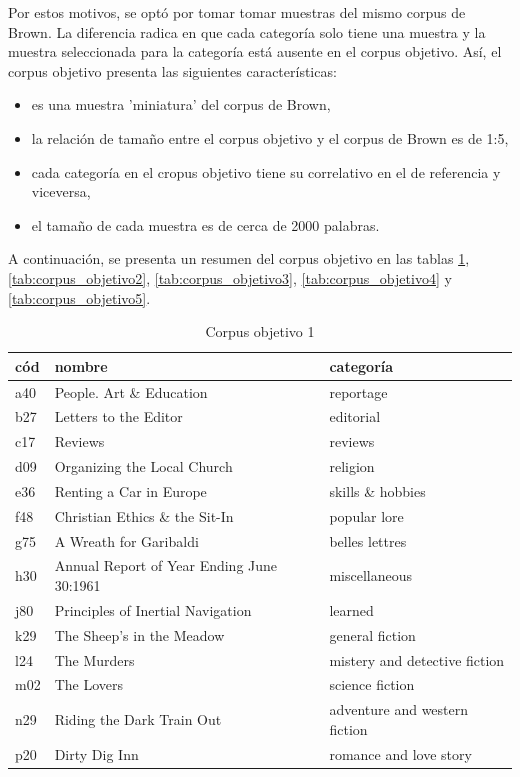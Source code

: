 \documentclass[12pt,letterpaper,twoside]{article}
\begin{document}
Por estos motivos, se optó por tomar tomar muestras del mismo corpus de Brown.
La diferencia radica en que cada categoría solo tiene una muestra y la muestra
seleccionada para la categoría está ausente en el corpus objetivo. Así,
el corpus objetivo presenta las siguientes características:

\begin{itemize}
\item es una muestra 'miniatura' del corpus de Brown,
\item la relación de tamaño entre el corpus objetivo y el corpus de Brown es de 1:5,
\item cada categoría en el cropus objetivo tiene su correlativo en el de referencia y viceversa,
\item el tamaño de cada muestra es de cerca de 2000 palabras.
\end{itemize}

A continuación, se presenta un resumen del corpus objetivo en las
tablas \ref{tab:corpus_objetivo1},
\ref{tab:corpus_objetivo2}, \ref{tab:corpus_objetivo3},
\ref{tab:corpus_objetivo4} y \ref{tab:corpus_objetivo5}.



   \begin{table}[!ht]
    \centering

    \begin{tabular}{|l|l|l|}
    \hline
	cód & nombre & categoría \\ \hline
      a40 & People. Art \& Education & reportage \\ \hline
      b27 & Letters to the Editor & editorial \\ \hline
      c17 & Reviews & reviews \\ \hline
      d09 & Organizing the Local Church & religion \\ \hline
      e36 & Renting a Car in Europe & skills \& hobbies \\ \hline
      f48 & Christian Ethics \& the Sit-In & popular lore \\ \hline
      g75 & A Wreath for Garibaldi & belles lettres \\ \hline
      h30 & Annual Report of Year Ending June 30:1961 & miscellaneous \\ \hline
      j80 & Principles of Inertial Navigation & learned \\ \hline
      k29 & The Sheep's in the Meadow & general fiction \\ \hline
      l24 & The Murders & mistery and detective fiction \\ \hline
      m02 & The Lovers & science fiction \\ \hline
      n29 & Riding the Dark Train Out & adventure and western fiction \\ \hline
      p20 & Dirty Dig Inn & romance and love story \\ \hline
    \end{tabular}
\caption{Corpus objetivo 1}
\label{tab:corpus_objetivo1}
\end{table}
\end{document}
